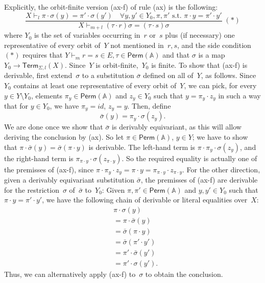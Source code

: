 \documentclass[11pt,a4paper]{amsart}
\newcommand{\Perm}{\mathsf{Perm}(\Names)}
\newcommand{\Term}{\mathsf{Term}}
\newcommand{\Names}{\mathbb{A}}
\theoremstyle{plain}
\newcommand{\id}{\mathit{id}}
\numberwithin{equation}{section}
\newcommand{\+}[1]{\mathcal{#1}\xspace}
\theoremstyle{definition}
\begin{document}
Explicitly, the orbit-finite version (ax-f) of rule (ax) is the following:
\begin{equation*}
  \frac{X \vdash_l \pi\cdot \sigma(y) = \pi'\cdot\sigma(y') \quad
    \forall y,y' \in Y_0, \pi,\pi' \text{ s.t.~$\pi\cdot y=\pi'\cdot y'$}}{X \vdash_{m + l} (\tau\cdot r)\sigma =
      (\tau\cdot s)\sigma} \;(*)
\end{equation*}
where $Y_0$ is the set of variables occurring in~$r$ or~$s$ plus (if
necessary) one representative of every orbit of~$Y$ not mentioned
in~$r,s$, and the side condition~$(*)$ requires that
$Y \vdash_m r = s \in E, \tau \in \Perm$ and that $\sigma$ is a map
$Y_0\to\Term_{\Sigma,l}(X)$. Since~$Y$ is orbit-finite,~$Y_0$ is
finite. To show that (ax-f) is derivable, first extend~$\sigma$ to a
substitution $\overline\sigma$ defined on all of~$Y$, as follows.
Since~$Y_0$ contains at least one representative of every orbit
of~$Y$, we can pick, for every~$y\in Y\setminus Y_0$, elements
$\pi_y\in \Perm$ and $z_y\in Y_0$ such that $y=\pi_y\cdot z_y$ in such a
way that for $y\in Y_0$, we have $\pi_y=\id$, $z_y=y$. Then, define
\begin{equation*}
  \bar\sigma(y)=\pi_y\cdot\sigma(z_y).
\end{equation*}
We are done once we show that $\bar\sigma$ is derivably equivariant,
as this will allow deriving the conclusion by (ax). So let $\pi\in \Perm$,
$y\in Y$; we have to show that
$\pi\cdot\bar\sigma(y)=\bar\sigma(\pi\cdot y)$ is derivable. The
left-hand term is $\pi\cdot\pi_y\cdot\sigma( z_y)$, and the right-hand
term is $\pi_{\pi\cdot y}\cdot\sigma(z_{\pi\cdot y})$. So the required
equality is actually one of the premisses of (ax-f), since
$\pi\cdot\pi_y\cdot z_y=\pi\cdot y=\pi_{\pi\cdot y}\cdot z_{\pi\cdot
  y}$. For the other direction, given a derivably equivariant substitution
$\bar\sigma$, the premisses of (ax-f) are derivable for the
restriction~$\sigma$ of~$\bar\sigma$ to~$Y_0$: Given $\pi,\pi'\in \Perm$
and $y,y'\in Y_0$ such that $\pi\cdot y=\pi'\cdot y'$, we have the
following chain of derivable or literal equalities
over~$X$:
\begin{align*}
  & \pi\cdot\sigma(y) \\
  & = \pi\cdot\bar\sigma(y) \\
  & = \bar\sigma(\pi\cdot y) \\
  & = \bar\sigma(\pi'\cdot y') \\
  & = \pi'\cdot\bar\sigma(y') \\
  & = \pi'\cdot\sigma(y').
\end{align*}
Thus, we can alternatively apply (ax-f) to~$\sigma$ to obtain the
conclusion.
\end{document}
